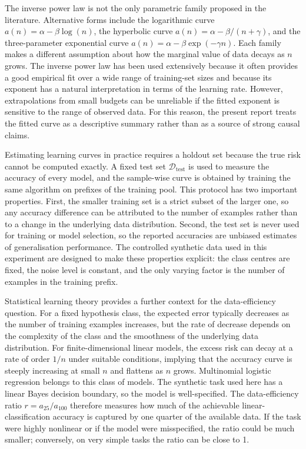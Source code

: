 \documentclass{article}
\begin{document}
The inverse power law is not the only parametric family proposed in the literature. Alternative forms include the logarithmic curve \(a(n)=\alpha-\beta \log(n)\), the hyperbolic curve \(a(n)=\alpha-\beta/(n+\gamma)\), and the three-parameter exponential curve \(a(n)=\alpha-\beta \exp(-\gamma n)\). Each family makes a different assumption about how the marginal value of data decays as \(n\) grows. The inverse power law has been used extensively because it often provides a good empirical fit over a wide range of training-set sizes and because its exponent has a natural interpretation in terms of the learning rate. However, extrapolations from small budgets can be unreliable if the fitted exponent is sensitive to the range of observed data. For this reason, the present report treats the fitted curve as a descriptive summary rather than as a source of strong causal claims.

Estimating learning curves in practice requires a holdout set because the true risk cannot be computed exactly. A fixed test set \(\mathcal{D}_{\text{test}}\) is used to measure the accuracy of every model, and the sample-wise curve is obtained by training the same algorithm on prefixes of the training pool. This protocol has two important properties. First, the smaller training set is a strict subset of the larger one, so any accuracy difference can be attributed to the number of examples rather than to a change in the underlying data distribution. Second, the test set is never used for training or model selection, so the reported accuracies are unbiased estimates of generalisation performance. The controlled synthetic data used in this experiment are designed to make these properties explicit: the class centres are fixed, the noise level is constant, and the only varying factor is the number of examples in the training prefix.

Statistical learning theory provides a further context for the data-efficiency question. For a fixed hypothesis class, the expected error typically decreases as the number of training examples increases, but the rate of decrease depends on the complexity of the class and the smoothness of the underlying data distribution. For finite-dimensional linear models, the excess risk can decay at a rate of order \(1/n\) under suitable conditions, implying that the accuracy curve is steeply increasing at small \(n\) and flattens as \(n\) grows. Multinomial logistic regression belongs to this class of models. The synthetic task used here has a linear Bayes decision boundary, so the model is well-specified. The data-efficiency ratio \(r=a_{25}/a_{100}\) therefore measures how much of the achievable linear-classification accuracy is captured by one quarter of the available data. If the task were highly nonlinear or if the model were misspecified, the ratio could be much smaller; conversely, on very simple tasks the ratio can be close to 1.
\end{document}
